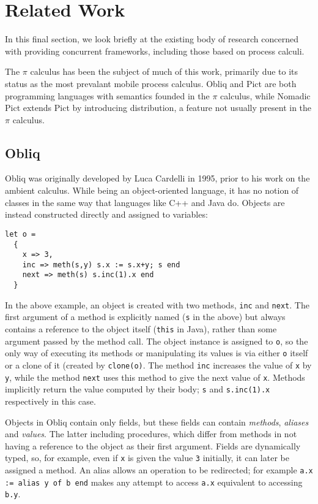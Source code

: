 \section{Related Work}
\label{dyn:relatedwork}

In this final section, we look briefly at the existing body of
research concerned with providing concurrent frameworks, including
those based on process calculi.

The $\pi$ calculus has been the subject of much of this work,
primarily due to its status as the most prevalant mobile process
calculus.  Obliq \cite{obliq} and Pict \cite{daveturner:phd} are both
programming languages with semantics founded in the $\pi$ calculus,
while Nomadic Pict \cite{wojciechowski:phd} extends Pict by
introducing distribution, a feature not usually present in the $\pi$
calculus.

\subsection{Obliq}
Obliq was originally developed by Luca Cardelli in 1995, prior to his
work on the ambient calculus.  While being an object-oriented
language, it has no notion of classes in the same way that languages
like C++ and Java do.  Objects are instead constructed directly and
assigned to variables:

\begin{verbatim}
let o = 
  { 
    x => 3,
    inc => meth(s,y) s.x := s.x+y; s end
    next => meth(s) s.inc(1).x end 
  }
\end{verbatim}

In the above example, an object is created with two methods,
\texttt{inc} and \texttt{next}.  The first argument of a method is
explicitly named (\texttt{s} in the above) but always contains a
reference to the object itself (\texttt{this} in Java), rather than
some argument passed by the method call.  The object instance is
assigned to \texttt{o}, so the only way of executing its methods or
manipulating its values is via either \texttt{o} itself or a clone of
it (created by \texttt{clone(o)}.  The method \texttt{inc} increases
the value of \texttt{x} by \texttt{y}, while the method \texttt{next}
uses this method to give the next value of \texttt{x}.  Methods
implicitly return the value computed by their body; \texttt{s} and
\texttt{s.inc(1).x} respectively in this case.

Objects in Obliq contain only fields, but these fields can contain
\emph{methods}, \emph{aliases} and \emph{values}.  The latter
including procedures, which differ from methods in not having a
reference to the object as their first argument.  Fields are
dynamically typed, so, for example, even if \texttt{x} is given the
value \texttt{3} initially, it can later be assigned a method.  An
alias allows an operation to be redirected; for example \texttt{a.x :=
  alias y of b end} makes any attempt to access \texttt{a.x}
equivalent to accessing \texttt{b.y}.


